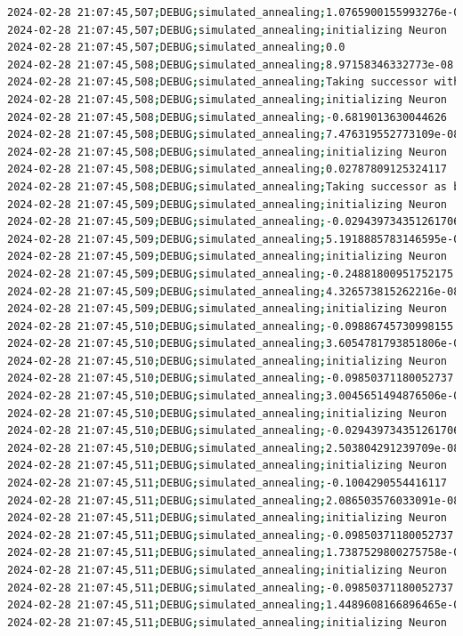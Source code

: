 \documentclass{article}
\begin{document}
\begin{lstlisting}[language=bash, caption=Example Output of Program]
2024-02-28 21:07:45,507;DEBUG;simulated_annealing;1.0765900155993276e-07
2024-02-28 21:07:45,507;DEBUG;simulated_annealing;initializing Neuron
2024-02-28 21:07:45,507;DEBUG;simulated_annealing;0.0
2024-02-28 21:07:45,508;DEBUG;simulated_annealing;8.97158346332773e-08
2024-02-28 21:07:45,508;DEBUG;simulated_annealing;Taking successor with probability 100% (exploration)
2024-02-28 21:07:45,508;DEBUG;simulated_annealing;initializing Neuron
2024-02-28 21:07:45,508;DEBUG;simulated_annealing;-0.6819013630044626
2024-02-28 21:07:45,508;DEBUG;simulated_annealing;7.476319552773109e-08
2024-02-28 21:07:45,508;DEBUG;simulated_annealing;initializing Neuron
2024-02-28 21:07:45,508;DEBUG;simulated_annealing;0.02787809125324117
2024-02-28 21:07:45,508;DEBUG;simulated_annealing;Taking successor as better option (exploitation)
2024-02-28 21:07:45,509;DEBUG;simulated_annealing;initializing Neuron
2024-02-28 21:07:45,509;DEBUG;simulated_annealing;-0.029439734351261706
2024-02-28 21:07:45,509;DEBUG;simulated_annealing;5.1918885783146595e-08
2024-02-28 21:07:45,509;DEBUG;simulated_annealing;initializing Neuron
2024-02-28 21:07:45,509;DEBUG;simulated_annealing;-0.24881800951752175
2024-02-28 21:07:45,509;DEBUG;simulated_annealing;4.326573815262216e-08
2024-02-28 21:07:45,509;DEBUG;simulated_annealing;initializing Neuron
2024-02-28 21:07:45,510;DEBUG;simulated_annealing;-0.09886745730998155
2024-02-28 21:07:45,510;DEBUG;simulated_annealing;3.6054781793851806e-08
2024-02-28 21:07:45,510;DEBUG;simulated_annealing;initializing Neuron
2024-02-28 21:07:45,510;DEBUG;simulated_annealing;-0.09850371180052737
2024-02-28 21:07:45,510;DEBUG;simulated_annealing;3.0045651494876506e-08
2024-02-28 21:07:45,510;DEBUG;simulated_annealing;initializing Neuron
2024-02-28 21:07:45,510;DEBUG;simulated_annealing;-0.029439734351261706
2024-02-28 21:07:45,510;DEBUG;simulated_annealing;2.503804291239709e-08
2024-02-28 21:07:45,511;DEBUG;simulated_annealing;initializing Neuron
2024-02-28 21:07:45,511;DEBUG;simulated_annealing;-0.1004290554416117
2024-02-28 21:07:45,511;DEBUG;simulated_annealing;2.086503576033091e-08
2024-02-28 21:07:45,511;DEBUG;simulated_annealing;initializing Neuron
2024-02-28 21:07:45,511;DEBUG;simulated_annealing;-0.09850371180052737
2024-02-28 21:07:45,511;DEBUG;simulated_annealing;1.7387529800275758e-08
2024-02-28 21:07:45,511;DEBUG;simulated_annealing;initializing Neuron
2024-02-28 21:07:45,511;DEBUG;simulated_annealing;-0.09850371180052737
2024-02-28 21:07:45,511;DEBUG;simulated_annealing;1.4489608166896465e-08
2024-02-28 21:07:45,511;DEBUG;simulated_annealing;initializing Neuron

\end{lstlisting}
\end{document}
